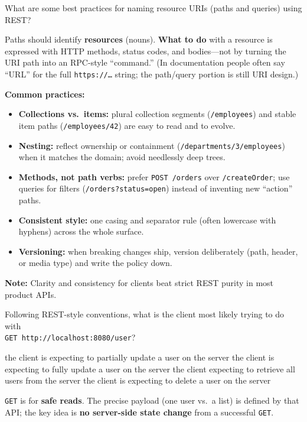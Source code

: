\question[4]
What are some best practices for naming resource URIs (paths and queries) using REST?
\begin{solutionorbox}[1.00in]
  Paths should identify \textbf{resources} (nouns). \textbf{What to do} with a resource is expressed with HTTP methods, status codes, and bodies---not by turning the URI path into an RPC-style ``command.'' (In documentation people often say ``URL'' for the full \texttt{https://\ldots} string; the path/query portion is still URI design.)

  \noindent\textbf{Common practices:}
  \begin{itemize}
    \item \textbf{Collections vs.\ items:} plural collection segments (\texttt{/employees}) and stable item paths (\texttt{/employees/42}) are easy to read and to evolve.
    \item \textbf{Nesting:} reflect ownership or containment (\texttt{/departments/3/employees}) when it matches the domain; avoid needlessly deep trees.
    \item \textbf{Methods, not path verbs:} prefer \texttt{POST /orders} over \texttt{/createOrder}; use queries for filters (\texttt{/orders?status=open}) instead of inventing new ``action'' paths.
    \item \textbf{Consistent style:} one casing and separator rule (often lowercase with hyphens) across the whole surface.
    \item \textbf{Versioning:} when breaking changes ship, version deliberately (path, header, or media type) and write the policy down.
  \end{itemize}

  \noindent\textbf{Note:} Clarity and consistency for clients beat strict REST purity in most product APIs.
\end{solutionorbox}

\question[4]
Following REST-style conventions, what is the client most likely trying to do with\\
\texttt{GET http://localhost:8080/user}?
\begin{choices}
  \choice the client is expecting to partially update a user on the server
  \choice the client is expecting to fully update a user on the server
  \CorrectChoice the client expecting to retrieve all users from the server
  \choice the client is expecting to delete a user on the server
\end{choices}
\begin{solution}
  \texttt{GET} is for \textbf{safe reads}. The precise payload (one user vs.\ a list) is defined by that API; the key idea is \textbf{no server-side state change} from a successful \texttt{GET}.
\end{solution}


